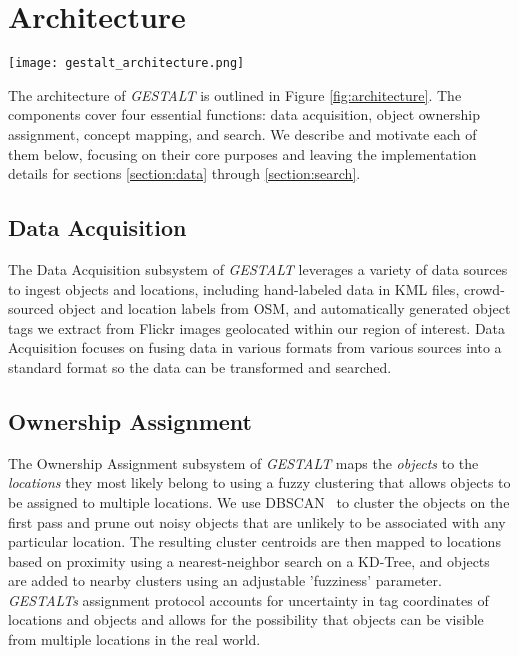 \section{Architecture}
\label{section:architecture}

\begin{figure*}[t]
    \texttt{[image: gestalt\_architecture.png]}
    \centering
    \caption[width=\textwidth]{The architecture of \emph{GESTALT} consists of the data collection subsystem, the ownership assignment process, the concept mapping process, and the search subsystem.}
    \label{fig:architecture}
\end{figure*}

The architecture of \textit{GESTALT} is outlined in Figure \ref{fig:architecture}. The components cover four essential functions: data acquisition, object ownership assignment, concept mapping, and search. 
We describe and motivate each of them below, focusing on their core purposes and leaving the implementation details for sections \ref{section:data} through \ref{section:search}. 

\subsection{Data Acquisition}
The Data Acquisition subsystem of \emph{GESTALT} leverages a variety of data sources to ingest objects and locations, including hand-labeled data in KML files, crowd-sourced object and location labels from OSM, and automatically generated object tags we extract from Flickr images geolocated within our region of interest. 
Data Acquisition focuses on fusing data in various formats from various sources into a standard format so the data can be transformed and searched.


\subsection{Ownership Assignment}
The Ownership Assignment subsystem of \emph{GESTALT} maps the \textit{objects} to the \textit{locations} they most likely belong to using a fuzzy clustering that allows objects to be assigned to multiple locations. 
We use DBSCAN~\cite{DBSCAN} to cluster the objects on the first pass and prune out noisy objects that are unlikely to be associated with any particular location.
The resulting cluster centroids are then mapped to locations based on proximity using a nearest-neighbor search on a KD-Tree, and objects are added to nearby clusters using an adjustable 'fuzziness' parameter.
\emph{GESTALTs} assignment protocol accounts for uncertainty in tag coordinates of locations and objects and allows for the possibility that objects can be visible from multiple locations in the real world.

